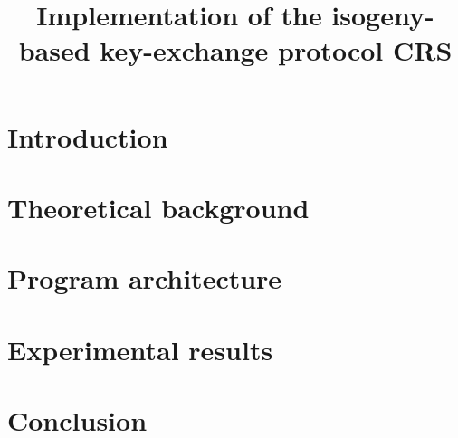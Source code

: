 \documentclass[12pt]{article}
\title{Implementation of the isogeny-based key-exchange protocol CRS}
\author{}
\date{}
\begin{document}
\maketitle
\renewcommand{\contentsname}{Table of content}
\tableofcontents
\newpage

%

\section*{Introduction}


\section{Theoretical background}


\newpage
\section{Program architecture}


\newpage
\section{Experimental results}


\newpage
{}
\section*{Conclusion}


{}

\end{document}
